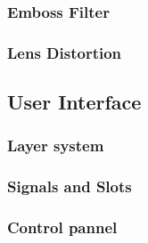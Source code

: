 \subsubsection{Emboss Filter}
\subsubsection{Lens Distortion}

\subsection{User Interface}

\subsubsection{Layer system}

\subsubsection{Signals and Slots}

\subsubsection{Control pannel}












